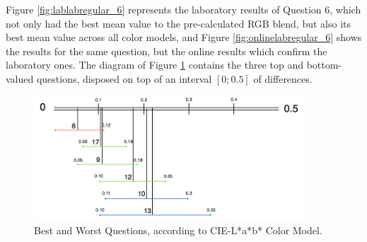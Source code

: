 %
Figure \ref{fig:lablabregular_6} represents the laboratory results of Question 6, which not only had the best mean value to the pre-calculated RGB blend, but also its best mean value across all color models,
and Figure \ref{fig:onlinelabregular_6} shows the results for the same question, but the online results which confirm the laboratory ones. The diagram of Figure \ref{fig:lab_analysis} contains the three top and bottom-valued questions, disposed on top of an interval $[0 ; 0.5]$ of differences. \par
%
\begin{figure}[!htbp]
  \centering
  \includegraphics[width=0.9\textwidth]{images/lab_questions_analysis.png}
  \caption[Best and Worst Questions, according to CIE-L*a*b* Color Model.]{Best and Worst Questions, according to CIE-L*a*b* Color Model.}
  \label{fig:lab_analysis}
\end{figure}
%
